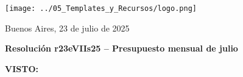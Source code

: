 \documentclass[12pt]{article}
\begin{document}
\begin{minipage}{0.3\textwidth}
  \vspace{-0.6cm}
  \texttt{[image: ../05\_Templates\_y\_Recursos/logo.png]}
\end{minipage}
\hfill
\begin{minipage}{0.65\textwidth}
  \begin{flushright}
    Buenos Aires, 23 de julio de 2025
  \end{flushright}
\end{minipage}

\vspace{1cm}

\begin{center}
  \textbf{\large Resolución r23eVIIs25 – Presupuesto mensual de julio}
\end{center}

\vspace{0.8cm}

\textbf{VISTO:}


\vspace{0.4cm}
\end{document}
